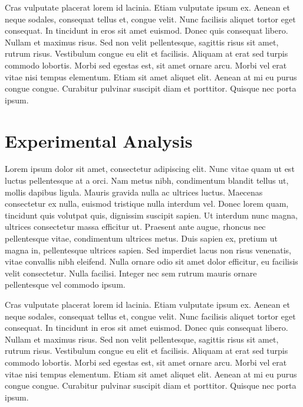 \documentclass[11pt]{scrreprt}
\begin{document}
Cras vulputate placerat lorem id lacinia. Etiam vulputate ipsum ex. Aenean et neque sodales, consequat tellus et, congue velit. Nunc facilisis aliquet tortor eget consequat. In tincidunt in eros sit amet euismod. Donec quis consequat libero. Nullam et maximus risus. Sed non velit pellentesque, sagittis risus sit amet, rutrum risus. Vestibulum congue eu elit et facilisis. Aliquam at erat sed turpis commodo lobortis. Morbi sed egestas est, sit amet ornare arcu. Morbi vel erat vitae nisi tempus elementum. Etiam sit amet aliquet elit. Aenean at mi eu purus congue congue. Curabitur pulvinar suscipit diam et porttitor. Quisque nec porta ipsum. 


\chapter{Experimental Analysis}

Lorem ipsum dolor sit amet, consectetur adipiscing elit. Nunc vitae quam ut est luctus pellentesque at a orci. Nam metus nibh, condimentum blandit tellus ut, mollis dapibus ligula. Mauris gravida nulla ac ultrices luctus. Maecenas consectetur ex nulla, euismod tristique nulla interdum vel. Donec lorem quam, tincidunt quis volutpat quis, dignissim suscipit sapien. Ut interdum nunc magna, ultrices consectetur massa efficitur ut. Praesent ante augue, rhoncus nec pellentesque vitae, condimentum ultrices metus. Duis sapien ex, pretium ut magna in, pellentesque ultrices sapien. Sed imperdiet lacus non risus venenatis, vitae convallis nibh eleifend. Nulla ornare odio sit amet dolor efficitur, eu facilisis velit consectetur. Nulla facilisi. Integer nec sem rutrum mauris ornare pellentesque vel commodo ipsum.

Cras vulputate placerat lorem id lacinia. Etiam vulputate ipsum ex. Aenean et neque sodales, consequat tellus et, congue velit. Nunc facilisis aliquet tortor eget consequat. In tincidunt in eros sit amet euismod. Donec quis consequat libero. Nullam et maximus risus. Sed non velit pellentesque, sagittis risus sit amet, rutrum risus. Vestibulum congue eu elit et facilisis. Aliquam at erat sed turpis commodo lobortis. Morbi sed egestas est, sit amet ornare arcu. Morbi vel erat vitae nisi tempus elementum. Etiam sit amet aliquet elit. Aenean at mi eu purus congue congue. Curabitur pulvinar suscipit diam et porttitor. Quisque nec porta ipsum. 
\end{document}
